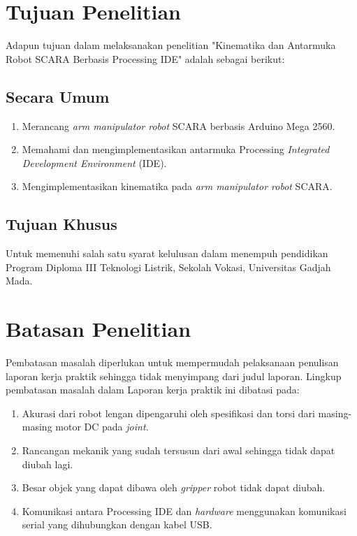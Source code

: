\section{Tujuan Penelitian}
Adapun tujuan dalam melaksanakan penelitian "Kinematika dan Antarmuka Robot SCARA Berbasis Processing IDE" adalah sebagai berikut:

	\subsection{Secara Umum}
		\begin{enumerate}
		\item Merancang\emph{ arm manipulator robot} SCARA berbasis Arduino Mega 2560.
		\item Memahami dan mengimplementasikan antarmuka Processing \textit{Integrated Development Environment} (IDE).
		\item Mengimplementasikan kinematika pada \emph{arm manipulator robot} SCARA.
	\end{enumerate}
	\subsection{Tujuan Khusus}
	 Untuk memenuhi salah satu syarat kelulusan dalam menempuh pendidikan Program   Diploma III Teknologi Listrik, Sekolah Vokasi, Universitas Gadjah Mada. 
	
	
\section{Batasan Penelitian}
	Pembatasan masalah diperlukan untuk mempermudah pelaksanaan penulisan laporan kerja praktik sehingga tidak menyimpang dari judul laporan. Lingkup pembatasan masalah dalam Laporan kerja praktik ini dibatasi pada:
	
	\begin{enumerate}
		
		\item Akurasi dari robot lengan dipengaruhi oleh spesifikasi dan torsi dari masing-masing motor DC pada \emph{ joint.}
		\item  Rancangan mekanik yang sudah tersusun dari awal sehingga tidak dapat diubah lagi. 
		\item Besar objek yang dapat dibawa oleh \textit{gripper} robot tidak dapat diubah.
		\item Komunikasi antara Processing IDE dan \textit{hardware} menggunakan komunikasi serial yang dihubungkan dengan kabel USB.
		
	\end{enumerate}

